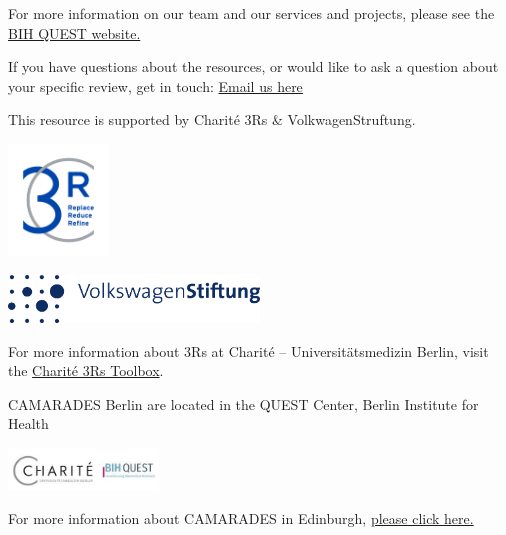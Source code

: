 \documentclass[
]{book}
\begin{document}
For more information on our team and our services and projects, please see the \href{https://www.bihealth.org/en/quest/service/service/camarades-facility-for-the-systematic-review-and-meta-analysis-1}{BIH QUEST website.}

If you have questions about the resources, or would like to ask a question about your specific review, get in touch: \href{mailto:CAMARADES.berlin@charite.de}{Email us here}

This resource is supported by Charité 3Rs \& VolkwagenStruftung.

\includegraphics[width=0.2\textwidth,height=\textheight]{figs/C3R_Screen_Farbe.jpg}

\includegraphics[width=0.5\textwidth,height=\textheight]{figs/Logo_Volkswagen.png}

For more information about 3Rs at Charité -- Universitätsmedizin Berlin, visit the \href{https://charite3r.charite.de/en/charite_3r_toolbox/}{Charité 3Rs Toolbox}.

CAMARADES Berlin are located in the QUEST Center, Berlin Institute for Health

\includegraphics[width=0.3\textwidth,height=\textheight]{charite-BIHquest.jpg}

For more information about CAMARADES in Edinburgh, \href{https://www.ed.ac.uk/clinical-brain-sciences/research/camarades}{please click here.}

  
\end{document}

